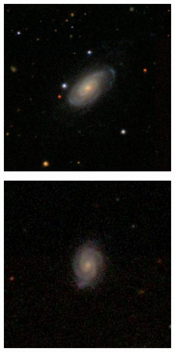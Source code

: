 \documentclass[12pt, onecolumn]{aa}
\begin{document}
\begin{figure}[h]
\centering
    \begin{subfigure}[t]{0.23\linewidth}
    \centering
    \includegraphics[width=\linewidth]{Figures/Correctly_Classified/Spiral/16.jpg}
    \caption{}
    \label{fig:correct_1}
    \end{subfigure}
    \begin{subfigure}[t]{0.23\linewidth}
    \centering
    \includegraphics[width=\linewidth]{Figures/Correctly_Classified/Spiral/18.jpg}

\end{subfigure}
\end{figure}
\end{document}
